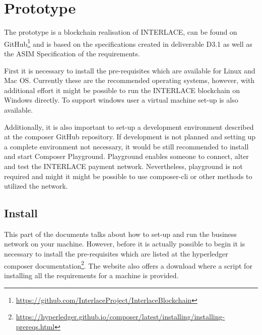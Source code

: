 

\section{Prototype}
\label{sec:prototype}

The prototype is a blockchain realisation of INTERLACE, can be found on GitHub\footnote{\url{https://github.com/InterlaceProject/InterlaceBlockchain}} and is based on the specifications created in deliverable D3.1\cite{INTERLACE_D31} as well as the ASIM Specification of the requirements.

First it is necessary to install the pre-requisites which are available for Linux and Mac OS. Currently these are the recommended operating systems, however, with additional effort it might be possible to run the INTERLACE blockchain on Windows directly. To support windows user a virtual machine set-up is also available.

Additionally, it is also important to set-up a development environment described at the composer GitHub repository. If development is not planned and setting up a complete environment not necessary, it would be still recommended to install and start Composer Playground. Playground enables someone to connect, alter and test the INTERLACE payment network. Nevertheless, playground is not required and might it might be possible to use composer-cli or other methods to utilized the network.

\subsection{Install}

This part of the documents talks about how to set-up and run the business network on your machine. However, before it is actually possible to begin it is necessary to install the pre-requisites which are listed at the hyperledger composer documentation\footnote{\url{https://hyperledger.github.io/composer/latest/installing/installing-prereqs.html}}. The website also offers a download where a script for installing all the requirements for a machine is provided.


